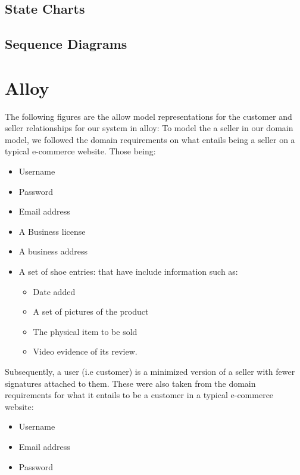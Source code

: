 \subsection{State Charts}

\subsection{Sequence Diagrams}
\section{Alloy}
The following figures are the allow model representations for the customer and seller relationships for our system in alloy:
To model the a seller in our domain model, we followed the domain requirements on what entails being a seller on a typical e-commerce website. Those being:
\begin{itemize}
  \item Username
  \item Password
  \item Email address
  \item A Business license
  \item A business address
  \item A set of shoe entries: that have include information such as:
  \begin{itemize}
    \item Date added
    \item A set of pictures of the product
    \item The physical item to be sold
    \item Video evidence of its review.
  \end{itemize}
\end{itemize}
Subsequently, a user (i.e customer) is a minimized version of a seller with fewer signatures attached to them. These were also taken from the domain requirements for what it entails to be a customer in a typical e-commerce website:
\begin{itemize}
  \item Username
  \item Email address
  \item Password
\end{itemize}
